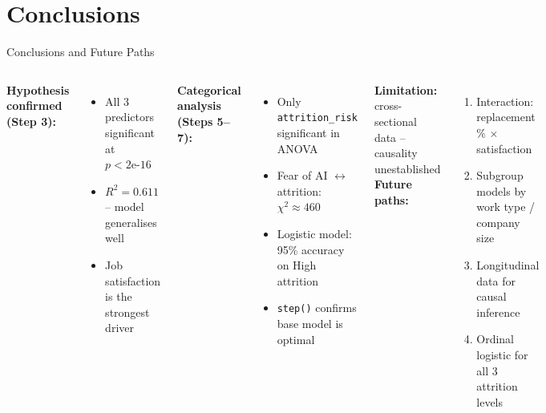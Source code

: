 \documentclass[aspectratio=1610, english]{beamer}
\begin{document}
\section{Conclusions}

\begin{frame}{Conclusions and Future Paths}
    \begin{columns}[t]
        \small
        \textbf{Hypothesis confirmed (Step 3):}
        \begin{itemize}
            \item All 3 predictors significant at $p < 2\text{e-}16$
            \item $R^2 = 0.611$ -- model generalises well
            \item Job satisfaction is the strongest driver
        \end{itemize}
        \vspace{0.4em}
        \textbf{Categorical analysis (Steps 5--7):}
        \begin{itemize}
            \item Only \texttt{attrition\_risk} significant in ANOVA
            \item Fear of AI $\leftrightarrow$ attrition: $\chi^2 \approx 460$
            \item Logistic model: 95\% accuracy on High attrition
            \item \texttt{step()} confirms base model is optimal
        \end{itemize}
        \vspace{0.3em}
        \textbf{Limitation:} cross-sectional data -- causality unestablished
        \small
        \textbf{Future paths:}
        \begin{enumerate}
            \item Interaction: replacement \% $\times$ satisfaction
            \item Subgroup models by work type / company size
            \item Longitudinal data for causal inference
            \item Ordinal logistic for all 3 attrition levels
        \end{enumerate}
    \end{columns}
\end{frame}
\end{document}
